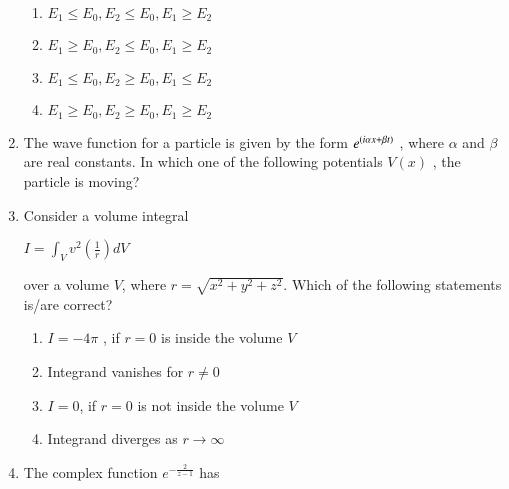 \documentclass[journal]{IEEEtran}
\begin{document}
\begin{enumerate}
\begin{enumerate}
\item $E_1 \leq E_0 , E_2 \leq E_0 , E_1 \geq E_2$ 
\item $E_1 \geq E_0 , E_2 \leq E_0 , E_1 \geq E_2$ 
\item $E_1 \leq E_0 , E_2 \geq E_0 , E_1 \leq E_2 $
\item $E_1 \geq E_0 , E_2 \geq E_0 , E_1 \geq E_2 $
\end{enumerate} 
\newpage
\item The wave function for a particle is given by the form  $e^{\left(i \alpha x + \beta t\right)}$ , where  $\alpha$  and  $\beta$ are real constants. In which one of the following potentials $V(x)$ , the particle is moving?
\begin{enumerate}
\end{enumerate}
\item  Consider a volume integral
\begin{center}
$I = \int_V v^2 \left( \frac{1}{r} \right) dV$
\end{center}
over a volume $V$, where $r = \sqrt{x^2 + y^2 + z^2}$. Which of the following statements is/are correct?
\begin{enumerate}
\item $I = -4\pi$ , if $r = 0$ is inside the volume $V$ 
\item Integrand vanishes for $r \neq 0$ 
\item $I = 0$, if $r = 0$ is not inside the volume $V$ 
\item Integrand diverges as $r \to \infty$ 
\end{enumerate}
\item The complex function $e^{-\frac{2}{z - 1}}$ has
\begin{enumerate}
\end{enumerate}
\end{enumerate}
\end{document}
